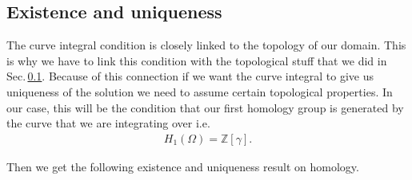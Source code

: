 \documentclass[12pt,a4paper]{article}
\numberwithin{equation}{subsection}
\numberwithin{lemma}{subsection}
\theoremstyle{definition}
\newcommand{\integers}{\mathbb{Z}}
\begin{document}
\subsection{Existence and uniqueness}

The curve integral condition is closely linked to the topology of our domain.
This is why we have to link this condition with the topological stuff that we
did in Sec.\,\ref{}. Because of this connection if we want the curve integral
to give us uniqueness of the solution we need to assume certain topological 
properties. In our case, this will be the condition that our first 
homology group is generated by the curve that we are integrating over i.e.
\begin{align*}
    H_1(\Omega) = \integers [\gamma].
\end{align*}

Then we get the following existence and uniqueness result on homology.
\end{document}
